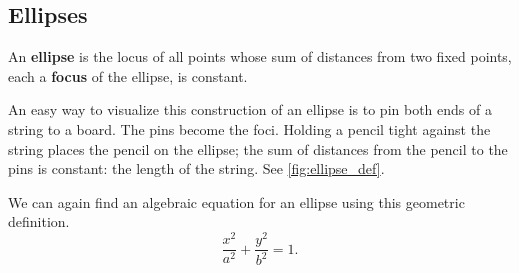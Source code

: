 \subsection{Ellipses}

\begin{definition}[Ellipse]\label{def:ellipse}%
An \textbf{ellipse} is the locus of all points whose sum of distances from two fixed points, each a \textbf{focus} of the ellipse, is constant.
\end{definition}

An easy way to visualize this construction of an ellipse is to pin both ends of a string to a board. The pins become the foci. Holding a pencil tight against the string places the pencil on the ellipse; the sum of distances from the pencil to the pins is constant: the length of the string. See \autoref{fig:ellipse_def}.



We can again find an algebraic equation for an ellipse using this geometric definition.
\iftoggle{abridgeConics}{}{%
Let the foci be located along the $x$-axis, $c$ units from the origin. Let these foci be labeled as $F_1 = (-c,0)$ and $F_2=(c,0)$. Let $P=(x,y)$ be a point on the ellipse. The sum of distances from $F_1$ to $P$ ($d_1$) and from $F_2$ to $P$ ($d_2$) is a constant $d$. That is, $d_1+d_2=d$. Using the Distance Formula, we have 
\[\sqrt{(x+c)^2+y^2} + \sqrt{(x-c)^2+y^2} = d.\]
Using a fair amount of algebra can produce the following equation of an ellipse (note that the equation is an implicitly defined function; it has to be, as an ellipse fails the Vertical Line Test):
\[
\frac{x^2}{\left(\frac d2\right)^2} + \frac{y^2}{\left(\frac d2\right)^2-c^2} = 1.
\]
This is not particularly illuminating, but by making the substitution $a=d/2$ and $b=\sqrt{a^2-c^2}$, we can rewrite the above equation as
}
\[\frac{x^2}{a^2} + \frac{y^2}{b^2} = 1.\]

